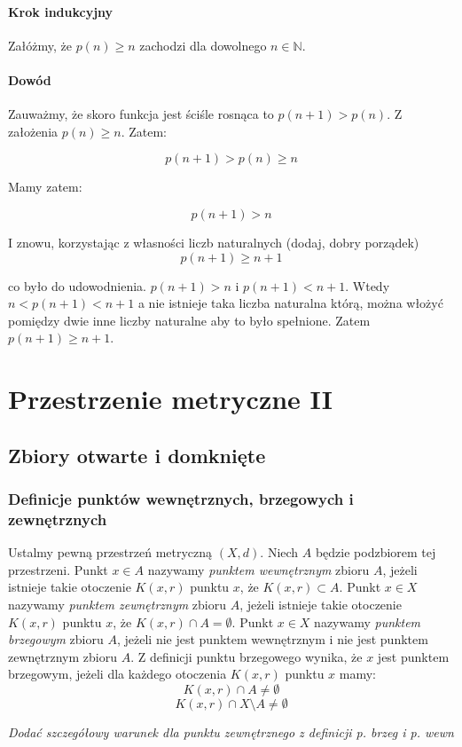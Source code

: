 \documentclass{article}
\begin{document}
\paragraph{Krok indukcyjny}
Załóżmy, że \(p(n) \geq n\) zachodzi dla dowolnego \(n \in \mathbb{N}\).

\paragraph{Dowód}
Zauważmy, że skoro funkcja jest ściśle rosnąca to \(p(n+1) > p(n)\).
Z założenia \(p(n) \geq n \). Zatem:

\begin{equation*}
    p(n+1) > p(n) \geq n
\end{equation*}

Mamy zatem:

\begin{equation*}
    p(n + 1) > n
\end{equation*}

I znowu, korzystając z własności liczb naturalnych (dodaj, dobry porządek)
\begin{equation*}
    p(n + 1) \geq n + 1
\end{equation*}

co było do udowodnienia.
$p(n+1) > n$ i \(p(n+1) < n + 1\). Wtedy $n < p(n+1) < n + 1$ a nie istnieje taka liczba naturalna
którą, można włożyć pomiędzy dwie inne liczby naturalne aby to było spełnione. Zatem $p(n + 1) \geq n + 1$.

\section{Przestrzenie metryczne II}
\subsection{Zbiory otwarte i domknięte}
\subsubsection{Definicje punktów wewnętrznych, brzegowych i zewnętrznych}
Ustalmy pewną przestrzeń metryczną \((X, d)\). Niech \(A\) będzie podzbiorem tej przestrzeni. Punkt \(x \in A\) nazywamy \emph{punktem wewnętrznym}
zbioru \(A\), jeżeli istnieje takie otoczenie \(K(x, r)\) punktu \(x\), że \(K(x,r) \subset A\). Punkt \(x \in X\) nazywamy
\emph{punktem zewnętrznym} zbioru \(A\), jeżeli istnieje takie otoczenie \(K(x, r)\) punktu \(x\),
że \(K(x, r) \cap A = \emptyset\). Punkt \(x \in X\) nazywamy \emph{punktem brzegowym} zbioru \(A\), jeżeli nie jest punktem
wewnętrznym i nie jest punktem zewnętrznym zbioru \(A\). Z definicji punktu brzegowego wynika, że \(x\) jest punktem
brzegowym, jeżeli dla każdego otoczenia \(K(x, r)\) punktu \(x\) mamy:
\begin{equation*}
    K(x, r) \cap A \neq \emptyset
\end{equation*}
\begin{equation*}
    K(x, r) \cap X \setminus A \neq \emptyset
\end{equation*}
\begin{center}
    \emph{Dodać szczegółowy warunek dla punktu zewnętrznego z definicji p. brzeg i p. wewn}
\end{center}
\newpage
\end{document}
